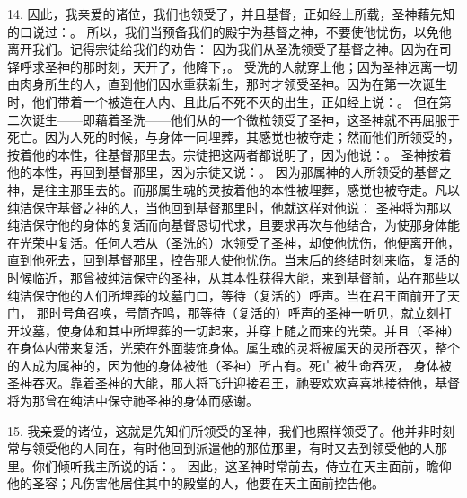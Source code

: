 14. 因此，我亲爱的诸位，我们也领受了，并且基督，正如经上所载，圣神藉先知的口说过：。 所以，我们当预备我们的殿宇为基督之神，不要使他忧伤，以免他离开我们。记得宗徒给我们的劝告： 因为我们从圣洗领受了基督之神。因为在司铎呼求圣神的那时刻，天开了，他降下，。 受洗的人就穿上他；因为圣神远离一切由肉身所生的人，直到他们因水重获新生，那时才领受圣神。因为在第一次诞生时，他们带着一个被造在人内、且此后不死不灭的出生，正如经上说：。 但在第二次诞生——即藉着圣洗——他们从的一个微粒领受了圣神，这圣神就不再屈服于死亡。因为人死的时候，与身体一同埋葬，其感觉也被夺走；然而他们所领受的，按着他的本性，往基督那里去。宗徒把这两者都说明了，因为他说：。 圣神按着他的本性，再回到基督那里，因为宗徒又说：。 因为那属神的人所领受的基督之神，是往主那里去的。而那属生魂的灵按着他的本性被埋葬，感觉也被夺走。凡以纯洁保守基督之神的人，当他回到基督那里时，他就这样对他说： 圣神将为那以纯洁保守他的身体的复活而向基督恳切代求，且要求再次与他结合，为使那身体能在光荣中复活。任何人若从（圣洗的）水领受了圣神，却使他忧伤，他便离开他，直到他死去，回到基督那里，控告那人使他忧伤。当末后的终结时刻来临，复活的时候临近，那曾被纯洁保守的圣神，从其本性获得大能，来到基督前，站在那些以纯洁保守他的人们所埋葬的坟墓门口，等待（复活的）呼声。当在君王面前开了天门， 那时号角召唤，号筒齐鸣，那等待（复活的）呼声的圣神一听见，就立刻打开坟墓，使身体和其中所埋葬的一切起来，并穿上随之而来的光荣。并且（圣神）在身体内带来复活，光荣在外面装饰身体。属生魂的灵将被属天的灵所吞灭，整个的人成为属神的，因为他的身体被他（圣神）所占有。死亡被生命吞灭， 身体被圣神吞灭。靠着圣神的大能，那人将飞升迎接君王，祂要欢欢喜喜地接待他，基督将为那曾在纯洁中保守祂圣神的身体而感谢。\par

15. 我亲爱的诸位，这就是先知们所领受的圣神，我们也照样领受了。他并非时刻常与领受他的人同在，有时他回到派遣他的那位那里，有时又去到领受他的人那里。你们倾听我主所说的话：。 因此，这圣神时常前去，侍立在天主面前，瞻仰他的圣容；凡伤害他居住其中的殿堂的人，他要在天主面前控告他。\par

